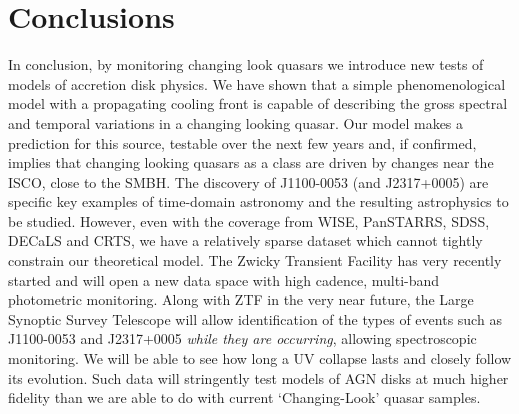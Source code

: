 \documentclass{nature}
\begin{document}
\section{Conclusions} 
In conclusion, by monitoring changing look quasars we introduce new
tests of models of accretion disk physics. We have shown that a simple
phenomenological model with a propagating cooling front is capable of
describing the gross spectral and temporal variations in a changing
looking quasar. Our model makes a prediction for this source, testable
over the next few years and, if confirmed, implies that changing
looking quasars as a class are driven by changes near the ISCO, close
to the SMBH. The discovery of J1100-0053 (and J2317+0005) are specific
key examples of time-domain astronomy and the resulting astrophysics
to be studied. However, even with the coverage from WISE, PanSTARRS,
SDSS, DECaLS and CRTS, we have a relatively sparse dataset which
cannot tightly constrain our theoretical model. The Zwicky Transient
Facility \citep[ZTF; ][]{Bellm2014} has very recently started and will
open a new data space with high cadence, multi-band photometric
monitoring. Along with ZTF in the very near future, the Large Synoptic
Survey Telescope \citep{Ivezic2008, LSST_ScienceBookV2} will allow
identification of the types of events such as J1100-0053 and
J2317+0005 \emph{while they are occurring}, allowing spectroscopic
monitoring. We will be able to see how long a UV collapse lasts and
closely follow its evolution.  Such data will stringently test models
of AGN disks at much higher fidelity than we are able to do with
current `Changing-Look' quasar samples.







%

\end{document}
